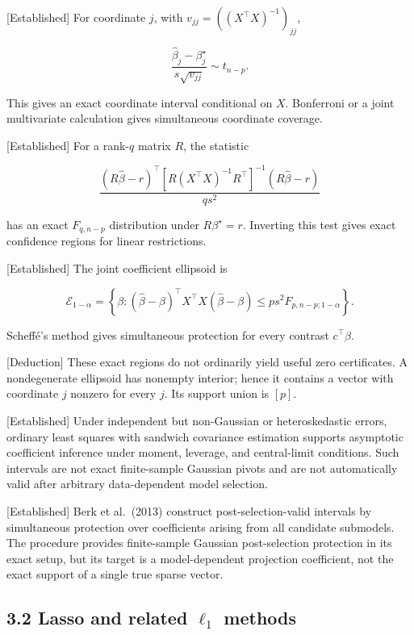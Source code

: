 \documentclass[
  english,
  11pt,
  a4paper,
]{article}
\newcounter{none} %
\begin{document}
{[}Established{]} For coordinate $j$, with
$v_{jj}=((X^\top X)^{-1})_{jj}$,

$$
\frac{\widehat\beta_j-\beta_j^\star}{s\sqrt{v_{jj}}}\sim t_{n-p}.
$$

This gives an exact coordinate interval conditional on $X$. Bonferroni
or a joint multivariate calculation gives simultaneous coordinate
coverage.

{[}Established{]} For a rank-$q$ matrix $R$, the statistic

$$
\frac{(R\widehat\beta-r)^\top
[R(X^\top X)^{-1}R^\top]^{-1}
(R\widehat\beta-r)}{q s^2}
$$

has an exact $F_{q,n-p}$ distribution under $R\beta^\star=r$.
Inverting this test gives exact confidence regions for linear
restrictions.

{[}Established{]} The joint coefficient ellipsoid is

$$
\mathcal E_{1-\alpha}=
\left\{\beta:
(\widehat\beta-\beta)^\top X^\top X(\widehat\beta-\beta)
\le p s^2F_{p,n-p;1-\alpha}
\right\}.
$$

Scheffé's method gives simultaneous protection for every contrast
$c^\top\beta$.

{[}Deduction{]} These exact regions do not ordinarily yield useful zero
certificates. A nondegenerate ellipsoid has nonempty interior; hence it
contains a vector with coordinate $j$ nonzero for every $j$. Its
support union is $[p]$.

{[}Established{]} Under independent but non-Gaussian or heteroskedastic
errors, ordinary least squares with sandwich covariance estimation
supports asymptotic coefficient inference under moment, leverage, and
central-limit conditions. Such intervals are not exact finite-sample
Gaussian pivots and are not automatically valid after arbitrary
data-dependent model selection.

{[}Established{]} Berk et al.~(2013) construct post-selection-valid
intervals by simultaneous protection over coefficients arising from all
candidate submodels. The procedure provides finite-sample Gaussian
post-selection protection in its exact setup, but its target is a
model-dependent projection coefficient, not the exact support of a
single true sparse vector.

\subsection{\texorpdfstring{3.2 Lasso and related $\ell_1$
methods}{3.2 Lasso and related \textbackslash ell\_1 methods}}\label{lasso-and-related-ell_1-methods}
\end{document}
